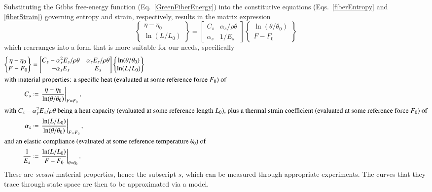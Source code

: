 Substituting the Gibbs free-energy function (Eq.~\ref{GreenFiberEnergy}) into the constitutive equations (Eqs.~\ref{fiberEntropy} and \ref{fiberStrain}) governing entropy and strain, respectively, results in the matrix expression
\begin{displaymath}
\left\{ \begin{matrix}
\eta - \eta_0 \\ \ln (L / L_0)
\end{matrix} \right\} = \begin{bmatrix}
C_s & \alpha_s / \rho \theta \\
\alpha_s & 1 / E_s
\end{bmatrix} \left\{ \begin{matrix}
\ln ( \theta / \theta_0 ) \\ F - F_0
\end{matrix} \right\}
\end{displaymath}
which rearranges into a form that is more suitable for our needs, specifically
\begin{subequations}
    \label{HookeanFiberModel}
    \begin{align}
    \left\{ \begin{matrix}
        \eta - \eta_0 \\ F - F_0
    \end{matrix} \right\} & = \begin{bmatrix}
        C_s - \alpha^2_s E_s / \rho \theta & 
        \alpha_s E_s / \rho \theta \\
        -\alpha_s E_s & E_s
    \end{bmatrix} \left\{ \begin{matrix}
        \ln ( \theta / \theta_0 ) \\ \ln (L / L_0) 
    \end{matrix} \right\}
    \label{elasticHookeanFiber} \\
    \intertext{with material properties: a specific heat (evaluated at some reference force $F_0$) of}
    C_s & \defeq 
    \left. \frac{\eta - \eta_0}{\ln( \theta / \theta_0 )}
    \right|_{F=F_0} ,
    \label{secantSpecificHeat} \\
    \intertext{with $C_s - \alpha^2_s E_s / \rho \theta$ being a heat capacity (evaluated at some reference length $L_0$), plus a thermal strain coefficient (evaluated at some reference force $F_0$) of}
    \alpha_s & \defeq \left. \frac{\ln(L/L_0)}{\ln(\theta/\theta_0)}
    \right|_{F=F_0} ,
    \label{secantThermalExpansion} \\
    \intertext{and an elastic compliance (evaluated at some reference temperature $\theta_0$) of}
    \frac{1}{E_s} & \defeq \left. \frac{\ln(L/L_0)}{F - F_0} \right|_{\theta=\theta_0} .
    \end{align}
\end{subequations}
These are \textit{secant\/} material properties, hence the subscript $s$, which can be measured through appropriate experiments.  The curves that they trace through state space are then to be approximated via a model.

